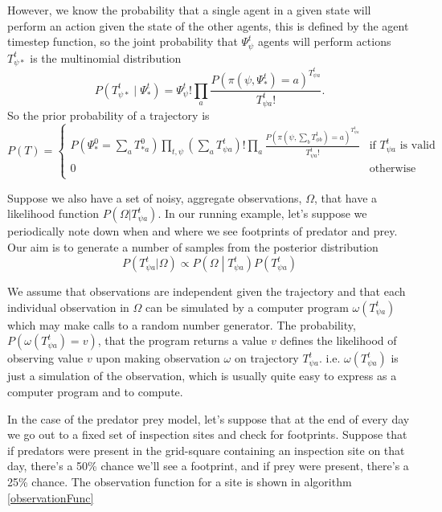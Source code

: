\documentclass{article}
\begin{document}
However, we know the probability that a single agent in a given state will perform an action given the state of the other agents, this is defined by the agent timestep function, so the joint probability that $\Psi^t_\psi$ agents will perform actions $T^t_{\psi *}$ is the multinomial distribution
\[
P\left(T^t_{\psi *} \mid \Psi^t_*\right) = \Psi^t_\psi!\prod_a \frac{P(\pi(\psi,\Psi^t_*)=a)^{T^{t}_{\psi a}}}{T^{t}_{\psi a}!}.
\]
So the prior probability of a trajectory is
\[
P(T) =
\begin{cases}
P(\Psi^0_* = \sum_aT^0_{* a}) \prod_{t, \psi}\left(\sum_a T^t_{\psi a}\right)!\prod_a \frac{P(\pi(\psi,\sum_bT^{t}_{\phi b})=a)^{T^{t}_{\psi a}}}{T^{t}_{\psi a}!} & \text{if } T^t_{\psi a} \text{ is valid} \\
0 & \text{otherwise}\\
\end{cases}
\]

Suppose we also have a set of noisy, aggregate observations, $\Omega$, that have a likelihood function $P(\Omega|T^t_{\psi a})$. In our running example, let's suppose we periodically note down when and where we see footprints of predator and prey. Our aim is to generate a number of samples from the posterior distribution
\[
P(T^t_{\psi a}|\Omega) \propto P\left(\Omega \middle| T^{t}_{\psi a}\right)P(T^t_{\psi a})
\]

We assume that observations are independent given the trajectory and that each individual observation in $\Omega$ can be simulated by a computer program $\omega(T^t_{\psi a})$ which may make calls to a random number generator. The probability, $P(\omega(T^t_{\psi a}) = v)$, that the program returns a value $v$ defines the likelihood of observing value $v$ upon making observation $\omega$ on trajectory $T^t_{\psi a}$. i.e. $\omega(T^t_{\psi a})$ is just a simulation of the observation, which is usually quite easy to express as a computer program and to compute. 

In the case of the predator prey model, let's suppose that at the end of every day we go out to a fixed set of inspection sites and check for footprints. Suppose that if predators were present in the grid-square containing an inspection site on that day, there's a 50\% chance we'll see a footprint, and if prey were present, there's a 25\% chance. The observation function for a site is shown in algorithm \ref{observationFunc}
\end{document}
